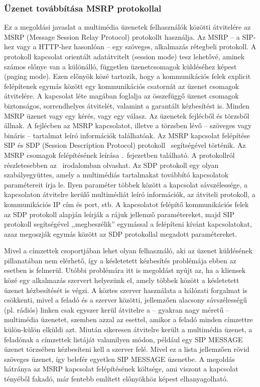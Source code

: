 \subsubsection{Üzenet továbbítása MSRP protokollal}
\label{sec:msrp_message}

Ez a megoldási javaslat a multimédia üzenetek felhasználók közötti átvitelére az MSRP (Message Session Relay Protocol) protokollt használja. Az MSRP -- a SIP-hez vagy a HTTP-hez hasonlóan -- egy szöveges, alkalmazás rétegbeli protokoll. A protokoll kapcsolat orientált adatátvitelt (session mode) tesz lehetővé, aminek számos előnye van a különálló, független üzenetcsomagok küldéséhez képest (paging mode).
Ezen előnyök közé tartozik, hogy a kommunikációs felek explicit felépítenek egymás között egy kommunikációs csatornát az üzenet csomagok átvitelére. A kapcsolat léte magában foglalja az összefüggő üzenet csomagok biztonságos, sorrendhelyes átvitelét, valamint a garantált kézbesítést is. Minden MSRP üzenet vagy egy kérés, vagy egy válasz. Az üzenetek fejlécből és törzsből állnak. A fejlécben az MSRP kapcsolatot, illetve a törzsben lévő -- szöveges vagy bináris -- tartalmat leíró információk találhatóak. Az MSRP kapcsolat felépítése SIP és SDP (Session Description Protocol) protokoll~\cite{rfc4566} segítségével történik. Az MSRP csomagok felépítésének leírása .~fejezetben található. A protokollról részletesebben az~\cite{rfc4975} irodalomban olvashat. Az SDP protokoll egy olyan szabályegyüttes, amely a multimédiás tartalmakat továbbító kapcsolatok paramétereit írja le. Ilyen paraméter többek között a kapcsolat sávszélessége, a kapcsolaton átvitelre kerülő multimédiát leíró információk, az átviteli protokoll, a kommunikációs IP cím és port, stb. A kapcsolatot felépítő kommunikációs felek az SDP protokoll alapján leírják a rájuk jellemző paramétereket, majd SIP protokoll segítségével ,,megbeszélik'' egymással a felépíteni kívánt kapcsolatokat, azaz megoszják egymás között az SDP protokollal megadott paramétereket. 

Mivel a címzettek csoportjában lehet olyan felhasználó, aki az üzenet küldésének pillanatában nem elérhető, így a késletetett kézbesítés problémája ebben az esetben is felmerül. Utóbbi problémára itt is megoldást nyújt az, ha a kliensek közé egy alkalmazás szervert helyezünk el, amely többek között a késletetett üzenet kézbesítését is végzi. A köztes szerver használata a hálózati forgalmat is csökkenti, mivel a feladó és a szerver közötti, jellemzően alacsony sávszélességű (pl. rádiós) linken csak egyszer kerül átvitelre a -- gyakran nagy méretű -- multimédia üzenetet, szemben azzal az esettel, amikor a feladó minden címzettre külön-külön elküldi azt. Miután sikeresen átvitelre került a multimédia üzenet, a feladónak a címzettek listáját valamilyen módon, például egy SIP MESSAGE üzenet törzsében kézbesíteni kell a szerver felé. Mivel ez a lista jellemzően rövid szöveges üzenet, így belefér egyetlen SIP MESSAGE üzenetbe. A megoldás hátránya az MSRP kapcsolat felépítésének költsége, ami viszont a kapcsolat tényéből fakadó, már fentebb említett előnyökhöz képest elhanyagolható.

